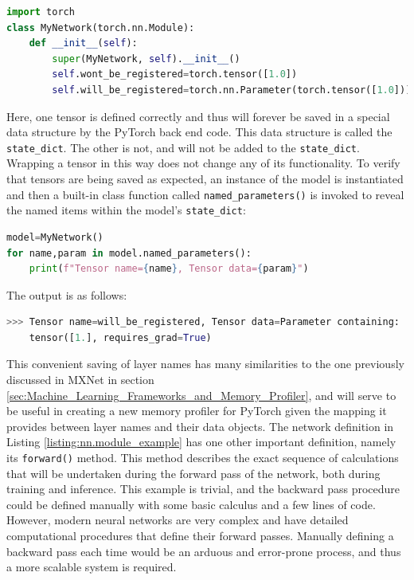 \documentclass[12pt,letterpaper]{article}
\begin{document}
\begin{lstlisting}[language=Python]
import torch
class MyNetwork(torch.nn.Module):
    def __init__(self):
        super(MyNetwork, self).__init__()
        self.wont_be_registered=torch.tensor([1.0])
        self.will_be_registered=torch.nn.Parameter(torch.tensor([1.0]))
\end{lstlisting}
Here, one tensor is defined correctly and thus will forever be saved in a special data structure by the PyTorch back end code. This data structure is called the \texttt{state\_dict}. The other is not, and will not be added to the \texttt{state\_dict}. Wrapping a tensor in this way does not change any of its functionality. To verify that tensors are being saved as expected, an instance of the model is instantiated and then a built-in class function called \texttt{named\_parameters()} is invoked to reveal the named items within the model's \texttt{state\_dict}:
\begin{lstlisting}[language=Python]
model=MyNetwork()
for name,param in model.named_parameters():
    print(f"Tensor name={name}, Tensor data={param}")
\end{lstlisting}
The output is as follows:
\begin{lstlisting}[language=Python]
>>> Tensor name=will_be_registered, Tensor data=Parameter containing:
    tensor([1.], requires_grad=True)
\end{lstlisting}
\par
This convenient saving of layer names has many similarities to the one previously discussed in MXNet in section \ref{sec:Machine_Learning_Frameworks_and_Memory_Profiler}, and will serve to be useful in creating a new memory profiler for PyTorch given the mapping it provides between layer names and their data objects. 
The network definition in Listing \ref{listing:nn.module_example} has one other important definition, namely its \texttt{forward()} method. This method describes the exact sequence of calculations that will be undertaken during the forward pass of the network, both during training and inference. This example is trivial, and the backward pass procedure could be defined manually with some basic calculus and a few lines of code. However, modern neural networks are very complex and have detailed computational procedures that define their forward passes. Manually defining a backward pass each time would be an arduous and error-prone process, and thus a more scalable system is required.
\par
\end{document}
